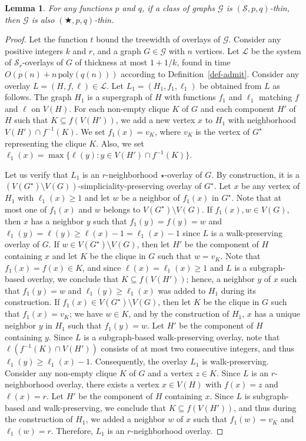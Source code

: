 \documentclass[a4paper,11pt]{article}
\newcommand{\GG}{{\mathcal G}}
\newcommand{\LL}{{\mathcal L}}
\newcommand{\Ss}{{\mathcal S}}
\newcommand{\poly}{\text{poly}}
\newtheorem{lemma}[theorem]{Lemma}
\begin{document}
\begin{lemma}\label{lemma-sgbas-star}
For any functions $p$ and $q$, if a class of graphs $\GG$ is $(\Ss,p,q)$-thin, then $\GG$ is also $(\bigstar,p,q)$-thin.
\end{lemma}
\begin{proof}
Let the function $t$ bound the treewidth of overlays of $\GG$.  Consider any positive integers $k$ and $r$,
and a graph $G\in \GG$ with $n$ vertices.
Let $\LL$ be the system of $\Ss_r$-overlays of $G$ of thickness at most $1+1/k$, found in time $O(p(n)+n\,\poly(q(n)))$ according to Definition~\ref{def-admit}.
Consider any overlay $L=(H,f,\ell)\in \LL$.  Let $L_1=(H_1,f_1,\ell_1)$ be obtained from $L$ as follows.
The graph $H_1$ is a supergraph of $H$ with functions $f_1$ and $\ell_1$ matching $f$ and $\ell$ on $V(H)$.
For each non-empty clique $K$ of $G$ and each component $H'$ of $H$ such that $K\subseteq f(V(H'))$, we add a new vertex $x$ to $H_1$
with neighborhood $V(H')\cap f^{-1}(K)$.  We set $f_1(x)=v_K$, where $v_K$ is the vertex of $G^\star$ representing the clique $K$.  Also, we set
$\ell_1(x)=\max\{\ell(y):y\in V(H')\cap f^{-1}(K)\}$.

Let us verify that $L_1$ is an $r$-neighborhood $\star$-overlay of $G$.  By construction, it is a $(V(G^\star)\setminus V(G))$-simpliciality-preserving overlay of $G^\star$.
Let $x$ be any vertex of $H_1$ with $\ell_1(x)\ge 1$ and let $w$ be a neighbor of $f_1(x)$ in $G^\star$.  Note that at most one of $f_1(x)$ and $w$ belongs to $V(G^\star)\setminus V(G)$.
If $f_1(x),w\in V(G)$, then $x$ has a neighbor $y$
such that $f_1(y)=f(y)=w$ and $\ell_1(y)=\ell(y)\ge\ell(x)-1=\ell_1(x)-1$ since $L$ is a walk-preserving overlay of $G$.
If $w\in V(G^\star)\setminus V(G)$, then let $H'$ be the component of $H$ containing $x$ and let $K$ be the clique in $G$ such that $w=v_K$.
Note that $f_1(x)=f(x)\in K$, and since $\ell(x)=\ell_1(x)\ge 1$ and $L$ is a subgraph-based overlay, we conclude that $K\subseteq f(V(H'))$;
hence, a neighbor $y$ of $x$ such that $f_1(y)=w$ and $\ell_1(y)\ge\ell_1(x)$ was added to $H_1$ during its construction.
If $f_1(x)\in V(G^\star)\setminus V(G)$, then let $K$ be the clique in $G$ such that $f_1(x)=v_K$; we have $w\in K$,
and by the construction of $H_1$, $x$ has a unique neighbor $y$ in $H_1$ such that $f_1(y)=w$.  Let $H'$ be the component of $H$ containing $y$.
Since $L$ is a subgraph-based walk-preserving overlay, note that $\ell(f^{-1}(K)\cap V(H'))$ consists of at most two consecutive integers,
and thus $\ell_1(y)\ge \ell_1(x)-1$.  Consequently, the overlay $L_1$ is walk-preserving.
Consider any non-empty clique $K$ of $G$ and a vertex $z\in K$.  Since $L$ is an $r$-neighborhood overlay,
there exists a vertex $x\in V(H)$ with $f(x)=z$ and $\ell(x)=r$.  Let $H'$ be the component of $H$ containing $x$.
Since $L$ is subgraph-based and walk-preserving, we conclude that $K\subseteq f(V(H'))$, and thus during the construction of $H_1$,
we added a neighbor $w$ of $x$ such that $f_1(w)=v_K$ and $\ell_1(w)=r$.  Therefore, $L_1$ is an $r$-neighborhood overlay.


\end{proof}
\end{document}
